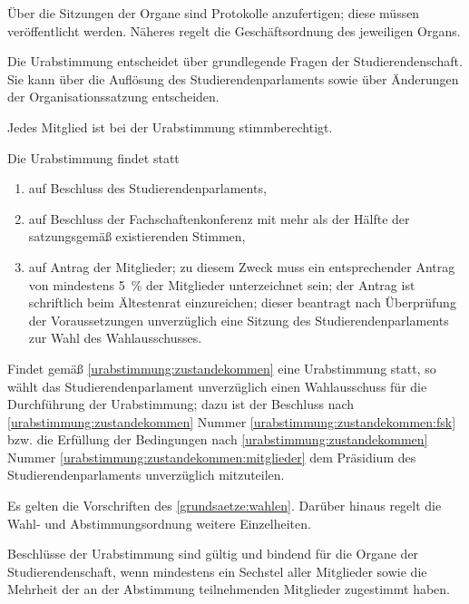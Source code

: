 \begin{jurdoc}
Über die Sitzungen der Organe sind Protokolle anzufertigen; diese müssen veröffentlicht werden. Näheres regelt die Geschäftsordnung des jeweiligen Organs.

%
%


Die Urabstimmung entscheidet über grundlegende Fragen der Studierendenschaft. Sie kann über die Auflösung des Studierendenparlaments sowie über Änderungen der Organisationssatzung entscheiden.

Jedes Mitglied ist bei der Urabstimmung stimmberechtigt.

\label{urabstimmung:zustandekommen}
Die Urabstimmung findet statt
\begin{enumerate}
\item auf Beschluss des Studierendenparlaments,
\item auf Beschluss der Fachschaftenkonferenz mit mehr als der Hälfte der satzungsgemäß existierenden Stimmen, \label{urabstimmung:zustandekommen:fsk}
\item auf Antrag der Mitglieder; zu diesem Zweck muss ein entsprechender Antrag von mindestens 5~\% der Mitglieder unterzeichnet sein; der Antrag ist schriftlich beim Ältestenrat einzureichen; dieser beantragt nach Überprüfung der Voraussetzungen unverzüglich eine Sitzung des Studierendenparlaments zur Wahl des Wahlausschusses. \label{urabstimmung:zustandekommen:mitglieder}
\end{enumerate}

\label{urabstimmung:orga}

Findet gemäß \ref{urabstimmung:zustandekommen} eine Urabstimmung statt, so wählt das Studierendenparlament unverzüglich einen Wahlausschuss für die Durchführung der Urabstimmung; dazu ist der Beschluss nach \ref{urabstimmung:zustandekommen} Nummer \ref{urabstimmung:zustandekommen:fsk} bzw. die Erfüllung  der Bedingungen nach \ref{urabstimmung:zustandekommen}  Nummer \ref{urabstimmung:zustandekommen:mitglieder} dem Präsidium des Studierendenparlaments unverzüglich mitzuteilen.

Es gelten die Vorschriften des \ref{grundsaetze:wahlen}. Darüber hinaus regelt die Wahl- und Abstimmungsordnung weitere Einzelheiten.



Beschlüsse der Urabstimmung sind gültig und bindend für die Organe der Studierendenschaft, wenn mindestens ein Sechstel aller Mitglieder sowie die Mehrheit der an der Abstimmung teilnehmenden Mitglieder zugestimmt haben.


\end{jurdoc}
